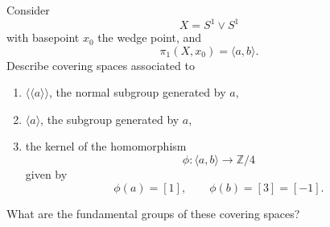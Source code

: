 \begin{problem}
Consider
\[
X=S^1\vee S^1
\]
with basepoint \(x_0\) the wedge point, and
\[
\pi_1(X,x_0)=\langle a,b\rangle.
\]
Describe covering spaces associated to
\begin{enumerate}
	\item[(i)] \(\langle\!\langle a\rangle\!\rangle\), the normal subgroup generated by \(a\),
	\item[(ii)] \(\langle a\rangle\), the subgroup generated by \(a\),
	\item[(iii)] the kernel of the homomorphism
	\[
	\phi:\langle a,b\rangle\to \mathbb Z/4
	\]
	given by
	\[
	\phi(a)=[1],\qquad \phi(b)=[3]=[-1].
	\]
\end{enumerate}
What are the fundamental groups of these covering spaces?
\end{problem}

